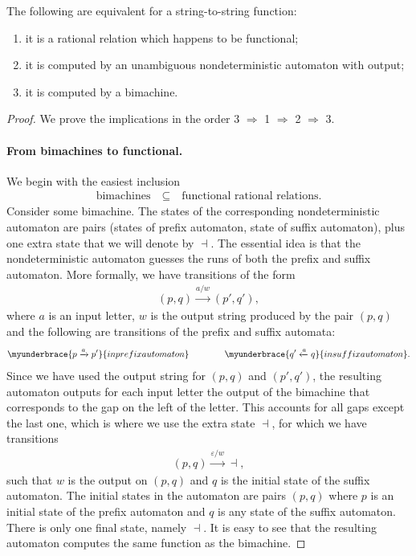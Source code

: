 \begin{theorem}\label{thm:bimachines}
    The following are equivalent for a string-to-string function:
    \begin{enumerate}
        \item it is a rational relation which happens to be functional;
        \item it is computed by an unambiguous nondeterministic automaton with output;
        \item it is computed by a bimachine.
    \end{enumerate}
\end{theorem}
\begin{proof}
    We prove the implications in the order 3 $\Rightarrow$ 1 $\Rightarrow$ 2 $\Rightarrow$ 3.

    \paragraph*{From bimachines to functional.}
    We begin with the  easiest inclusion 
    \begin{align*}
    \text{bimachines} \quad \subseteq \quad \text{functional rational relations.}
    \end{align*}
    Consider some bimachine. The states of the corresponding nondeterministic automaton are pairs (states of prefix automaton, state of suffix automaton), plus one extra state that we will denote by $\dashv$. The essential idea is that the nondeterministic automaton guesses the runs of both the prefix and suffix automaton. More formally, we have transitions of the form 
    \begin{align*}
    (p,q) \xrightarrow{ a / w} (p',q'),
    \end{align*}
    where $a$ is an input letter,  $w$ is the output string produced by the pair $(p,q)$ and the following are transitions of the prefix and suffix automata:
    \begin{align*}
      \myunderbrace{p \xrightarrow a p'}{in prefix automaton} \qquad \qquad
      \myunderbrace{q' \xleftarrow a q}{in suffix automaton}.
    \end{align*}
    Since we have used the output string for $(p,q)$ and $(p',q')$, the resulting automaton outputs for each input  letter the output  of the bimachine that corresponds to the gap on the left of the letter. This accounts for all gaps except the last one, which is where we use the extra state $\dashv$, for which we have transitions 
    \begin{align*}
    (p,q) \xrightarrow {\varepsilon/ w} \dashv,
    \end{align*}
    such that $w$ is the output on $(p,q)$ and $q$ is the initial state of the suffix automaton. The initial states in the automaton are pairs $(p,q)$ where $p$ is an initial state of the prefix automaton and $q$ is any state of the suffix automaton. There is only one final state, namely $\dashv$. It is easy to see that the resulting automaton computes the same function as the bimachine.


\end{proof}
